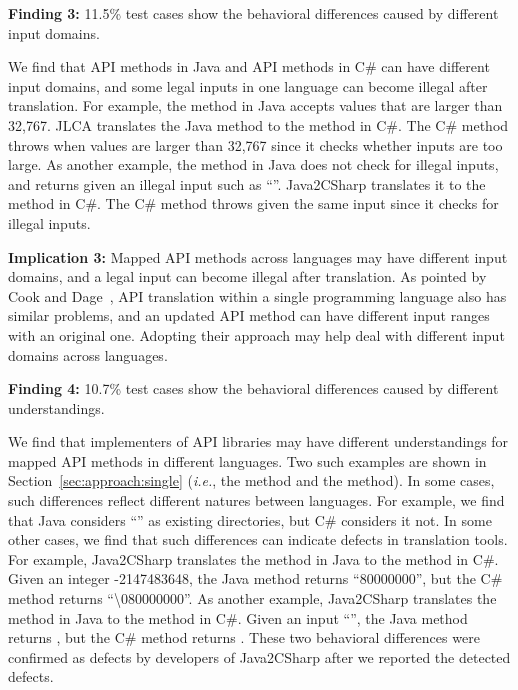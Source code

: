 \textbf{Finding 3:} 11.5\% test cases show the behavioral differences caused by different input domains.

We find that API methods in Java and API methods in C\# can have different input domains, and some legal inputs in one language can become illegal after translation. For example, the  method in Java accepts values that are larger than 32,767. JLCA translates the Java method to the  method in C\#. The C\# method throws  when values are larger than 32,767 since it checks whether inputs are too large.
As another example, the  method in Java does not check for illegal inputs, and returns  given an illegal input such as ``''. Java2CSharp translates it to the  method in C\#. The C\# method throws  given the same input since it checks for illegal inputs.

\textbf{Implication 3:} Mapped API methods across languages may have different input domains, and a legal input can become illegal after translation. As pointed by Cook and Dage~\citep{cook1999highly}, API translation within a single programming language also has similar problems, and an updated API method can have different input ranges with an original one. Adopting their approach may help deal with different input domains across languages.

\textbf{Finding 4:} 10.7\% test cases show the behavioral differences caused by different understandings.

We find that implementers of API libraries may have different understandings for mapped API methods in different languages. Two such examples are shown in Section~\ref{sec:approach:single} (\emph{i.e.}, the  method and the  method). In some cases, such differences reflect different natures between languages. For example, we find that Java considers ``\CodeIn{\textbackslash}'' as existing directories, but  C\# considers it not. In some other cases, we find that such differences can indicate defects in translation tools. For example, Java2CSharp translates the  method in Java to the  method in C\#.
Given an integer -2147483648, the Java method returns ``80000000'', but the C\# method returns ``\textbackslash080000000''. As another example, Java2CSharp translates the  method in Java to the  method in C\#. Given an input ``'', the Java method returns , but the C\# method returns . These two behavioral differences were confirmed as defects by developers of Java2CSharp after we reported the detected defects.

